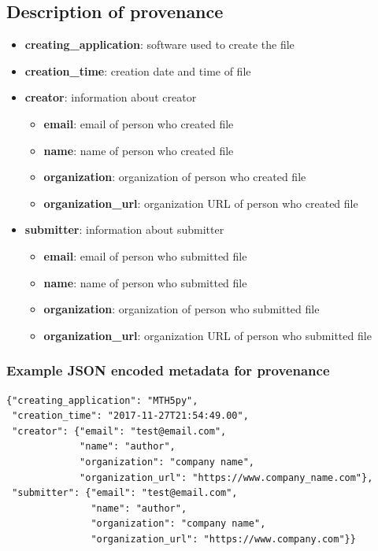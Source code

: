 \documentclass{article}
\newcommand{\attr}[1]{\textbf{#1}}
\begin{document}
\subsection{Description of \textbf{provenance}} 

\begin{itemize}
	\setlength{\itemsep}{.05em}
	\item \attr{creating\_application}: software used to create the file
	\item \attr{creation\_time}: creation date and time of file
	\item \attr{creator}: information about creator 
	\begin{itemize}
		\setlength{\itemsep}{.05em}
		\item \attr{email}: email of person who created file
		\item \attr{name}: name of person who created file
		\item \attr{organization}: organization of person who created file
		\item \attr{organization\_url}: organization URL of person who created file
	\end{itemize}
	\item \attr{submitter}: information about submitter 
	\begin{itemize}
		\setlength{\itemsep}{.05em}
		\item \attr{email}: email of person who submitted file
		\item \attr{name}: name of person who submitted file
		\item \attr{organization}: organization of person who submitted file
		\item \attr{organization\_url}: organization URL of person who submitted file
	\end{itemize}
\end{itemize}
   
\subsubsection{Example JSON encoded metadata for \textbf{provenance}}
\begin{verbatim}
{"creating_application": "MTH5py",
 "creation_time": "2017-11-27T21:54:49.00",
 "creator": {"email": "test@email.com",
             "name": "author",
             "organization": "company name",
             "organization_url": "https://www.company_name.com"},
 "submitter": {"email": "test@email.com",
               "name": "author",
               "organization": "company name",
               "organization_url": "https://www.company.com"}}
\end{verbatim}
  
\end{document}
